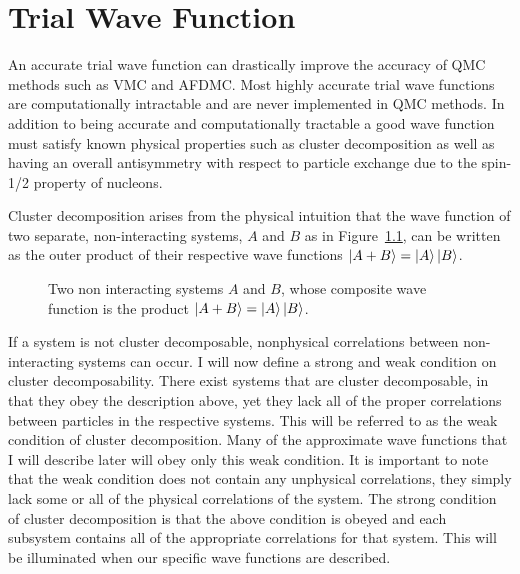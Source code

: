 \chapter{Trial Wave Function}
\label{ch:trial}
An accurate trial wave function can drastically improve the accuracy of QMC methods such as VMC and AFDMC. Most highly accurate trial wave functions are computationally intractable and are never implemented in QMC methods. In addition to being accurate and computationally tractable a good wave function must satisfy known physical properties such as cluster decomposition as well as having an overall antisymmetry with respect to particle exchange due to the spin-1/2 property of nucleons.

Cluster decomposition arises from the physical intuition that the wave function of two separate, non-interacting systems, $A$ and $B$ as in Figure~\ref{fig:cluster}, can be written as the outer product of their respective wave functions $\left| A+B \right>=\left| A \right>\left| B \right>$.
\begin{figure}[h]
   \centering
   \caption{Two non interacting systems $A$ and $B$, whose composite wave function is the product $\left| A+B \right>=\left| A \right>\left| B \right>$.}
   \label{fig:cluster}
\end{figure}
If a system is not cluster decomposable, nonphysical correlations between non-interacting systems can occur. I will now define a strong and weak condition on cluster decomposability. There exist systems that are cluster decomposable, in that they obey the description above, yet they lack all of the proper correlations between particles in the respective systems. This will be referred to as the weak condition of cluster decomposition. Many of the approximate wave functions that I will describe later will obey only this weak condition. It is important to note that the weak condition does not contain any unphysical correlations, they simply lack some or all of the physical correlations of the system. The strong condition of cluster decomposition is that the above condition is obeyed and each subsystem contains all of the appropriate correlations for that system. This will be illuminated when our specific wave functions are described.

